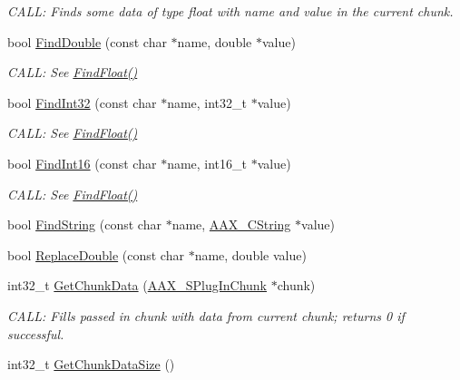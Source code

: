\begin{DoxyCompactItemize}
\begin{DoxyCompactList}\small\item\em C\+A\+LL\+: Finds some data of type float with {\itshape name} and {\itshape value} in the current chunk. \end{DoxyCompactList}\item 
bool \mbox{\hyperlink{a01461_ac853da85bf797172a8bc3db5bcf98e66}{Find\+Double}} (const char $\ast$name, double $\ast$value)
\begin{DoxyCompactList}\small\item\em C\+A\+LL\+: See \mbox{\hyperlink{a01461_a0651792f378318532e5be3799b108e58}{Find\+Float()}} \end{DoxyCompactList}\item 
bool \mbox{\hyperlink{a01461_ad6bbac0856350d4d1734cb7de594149a}{Find\+Int32}} (const char $\ast$name, int32\+\_\+t $\ast$value)
\begin{DoxyCompactList}\small\item\em C\+A\+LL\+: See \mbox{\hyperlink{a01461_a0651792f378318532e5be3799b108e58}{Find\+Float()}} \end{DoxyCompactList}\item 
bool \mbox{\hyperlink{a01461_aaa004cdaafabb16caf7c0bad7e71db8f}{Find\+Int16}} (const char $\ast$name, int16\+\_\+t $\ast$value)
\begin{DoxyCompactList}\small\item\em C\+A\+LL\+: See \mbox{\hyperlink{a01461_a0651792f378318532e5be3799b108e58}{Find\+Float()}} \end{DoxyCompactList}\item 
bool \mbox{\hyperlink{a01461_a4272b40bb46bb54c0083d7313b3d73f7}{Find\+String}} (const char $\ast$name, \mbox{\hyperlink{a01573}{A\+A\+X\+\_\+\+C\+String}} $\ast$value)
\item 
bool \mbox{\hyperlink{a01461_af394b04f20c198396c4a4090bdeff06c}{Replace\+Double}} (const char $\ast$name, double value)
\item 
int32\+\_\+t \mbox{\hyperlink{a01461_a7cc4e0325d71d6957cdd10c1eaf5d8bc}{Get\+Chunk\+Data}} (\mbox{\hyperlink{a01421}{A\+A\+X\+\_\+\+S\+Plug\+In\+Chunk}} $\ast$chunk)
\begin{DoxyCompactList}\small\item\em C\+A\+LL\+: Fills passed in {\itshape chunk} with data from current chunk; returns 0 if successful. \end{DoxyCompactList}\item 
int32\+\_\+t \mbox{\hyperlink{a01461_ac113458fcdec81f316014ea4c3d73582}{Get\+Chunk\+Data\+Size}} ()

\end{DoxyCompactItemize}
